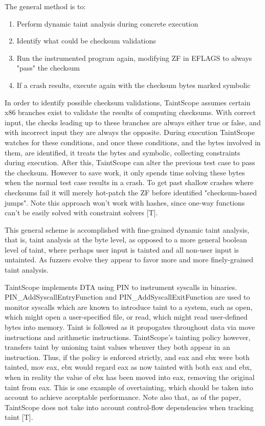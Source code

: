 \documentclass[11pt,expanded,copyright]{fsuthesis}
\begin{document}
The general method is to:

\begin{enumerate}
	\item Perform dynamic taint analysis during concrete execution
	\item Identify what could be checksum validations
	\item Run the instrumented program again, modifying ZF in EFLAGS to always "pass" the  checksum
	\item If a crash results, execute again with the checksum bytes marked symbolic
\end{enumerate}

In order to identify possible checksum validations, TaintScope assumes certain x86 branches exist to validate the results of computing checksums. With correct input, the checks leading up to these branches are always either true or false, and with incorrect input they are always the opposite. During execution TaintScope watches for these conditions, and once these conditions, and the bytes involved in them, are identified, it treats the bytes and symbolic, collecting constraints during execution. After this, TaintScope can alter the previous test case to pass the checksum. However to save work, it only spends time solving these bytes when the normal test case results in a crash. To get past shallow crashes where checksums fail it will merely hot-patch the ZF before identified "checksum-based jumps". Note this approach won't work with hashes, since one-way functions can't be easily solved with constraint solvers [T].

This general scheme is accomplished with fine-grained dynamic taint analysis, that is, taint analysis at the byte level, as opposed to a more general boolean level of taint, where perhaps user input is tainted and all non-user input is untainted. As fuzzers evolve they appear to favor more and more finely-grained taint analysis.

TaintScope implements DTA using PIN to instrument syscalls in binaries. PIN\_AddSyscallEntryFunction and PIN\_AddSyscallExitFunction are used to monitor syscalls which are known to introduce taint to a system, such as open, which might open a user-specified file, or read, which might read user-defined bytes into memory. Taint is followed as it propogates throughout data via move instructions and arithmetic instructions. TaintScope's tainting policy however, transfers taint by unioning taint values whenver they both appear in an instruction. Thus, if the policy is enforced strictly, and eax and ebx were both tainted, mov eax, ebx would regard eax as now tainted with both eax and ebx, when in reality the value of ebx has been moved into eax, removing the original taint from eax. This is one example of overtainting, which should be taken into account to achieve acceptable performance. Note also that, as of the paper, TaintScope does not take into account control-flow dependencies when tracking taint [T].
\end{document}
